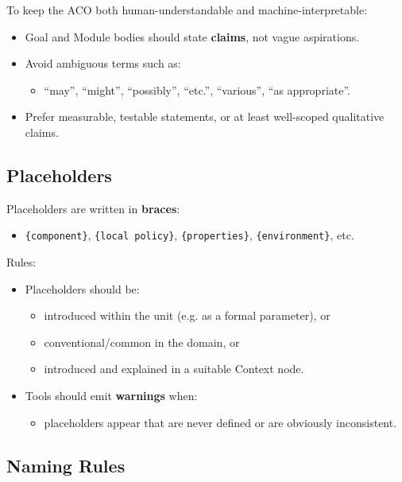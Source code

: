 \documentclass[11pt,twoside,a4paper]{article}
\begin{document}
To keep the ACO both human-understandable and machine-interpretable:
\begin{itemize}[leftmargin=2em]
  \item Goal and Module bodies should state \textbf{claims}, not vague aspirations.
  \item Avoid ambiguous terms such as:
  \begin{itemize}[leftmargin=1.5em]
    \item ``may'', ``might'', ``possibly'', ``etc.'', ``various'', ``as appropriate''.
  \end{itemize}
  \item Prefer measurable, testable statements, or at least well-scoped qualitative claims.
\end{itemize}

\subsection{Placeholders}

Placeholders are written in \textbf{braces}:
\begin{itemize}[leftmargin=2em]
  \item \texttt{\{component\}}, \texttt{\{local policy\}}, \texttt{\{properties\}}, \texttt{\{environment\}}, etc.
\end{itemize}

Rules:
\begin{itemize}[leftmargin=2em]
  \item Placeholders should be:
  \begin{itemize}[leftmargin=1.5em]
    \item introduced within the unit (e.g. as a formal parameter), or
    \item conventional/common in the domain, or
    \item introduced and explained in a suitable Context node.
  \end{itemize}
  \item Tools should emit \textbf{warnings} when:
  \begin{itemize}[leftmargin=1.5em]
    \item placeholders appear that are never defined or are obviously inconsistent.
  \end{itemize}
\end{itemize}

\subsection{Naming Rules}
\end{document}
